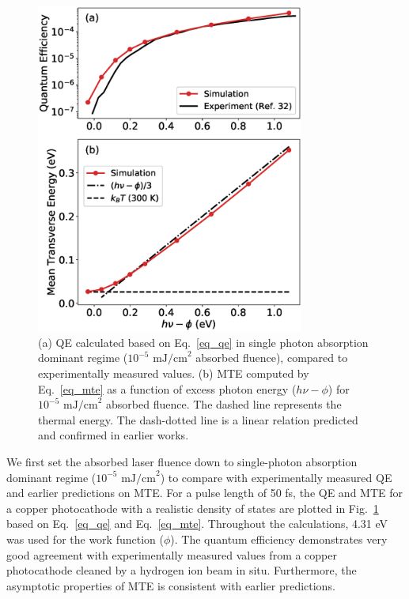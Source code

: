 \begin{figure}[h!]
	\centering
	\includegraphics*[width=250pt]{figs/boltzmann/low.eps}
	\caption{(a) QE calculated based on Eq.~\ref{eq_qe} in single photon absorption dominant regime ($10^{-5} \textrm{ mJ/cm}^2$ absorbed fluence), compared to experimentally measured values.\cite{Dowell2006} (b)  MTE computed by Eq.~\ref{eq_mte} as a function of excess photon energy ($h\nu - \phi$) for $10^{-5} \textrm{ mJ/cm}^2$ absorbed fluence. The dashed line represents the thermal energy. The dash-dotted line is a linear relation predicted and confirmed in earlier works.\cite{dowell2009_QuantumEfficiencyThermal,Feng2015,Dimitrov2017}}
	\label{fig_low}
\end{figure}

We first set the absorbed laser fluence down to single-photon absorption dominant regime ($10^{-5} \textrm{ mJ/cm}^2$) to compare with experimentally measured QE \cite{Dowell2006} and earlier predictions on MTE.\cite{dowell2009_QuantumEfficiencyThermal,Feng2015,Dimitrov2017} For a pulse length of 50 fs, the QE and MTE for a copper photocathode with a realistic density of states are plotted in Fig.~\ref{fig_low} based on Eq.~\ref{eq_qe} and Eq.~\ref{eq_mte}.
Throughout the calculations, 4.31 eV was used for the work function ($\phi$).\cite{Dowell2006} The quantum efficiency demonstrates very good agreement with experimentally measured values from a copper photocathode cleaned by a hydrogen ion beam in situ.\cite{Dowell2006} Furthermore, the asymptotic properties of MTE is consistent with earlier predictions.\cite{dowell2009_QuantumEfficiencyThermal,Feng2015,Dimitrov2017}

